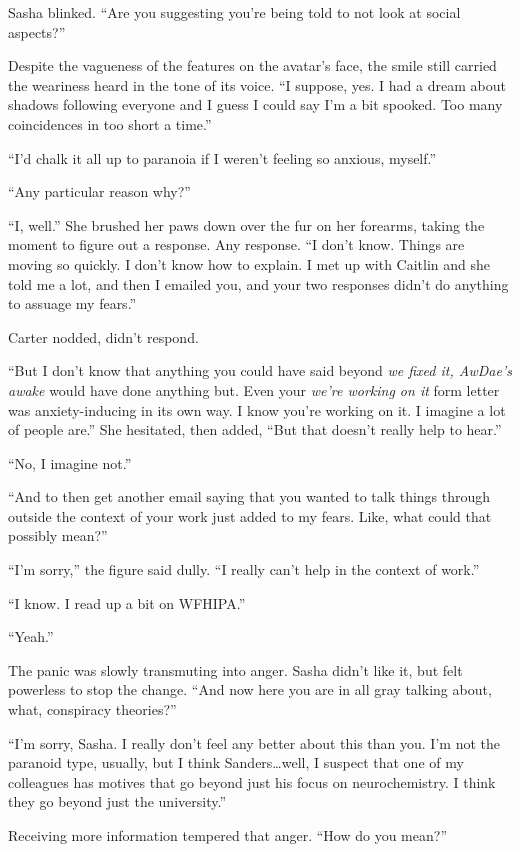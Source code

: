 Sasha blinked. ``Are you suggesting you're being told to not look at social aspects?''

Despite the vagueness of the features on the avatar's face, the smile still carried the weariness heard in the tone of its voice. ``I suppose, yes. I had a dream about shadows following everyone and I guess I could say I'm a bit spooked. Too many coincidences in too short a time.''

``I'd chalk it all up to paranoia if I weren't feeling so anxious, myself.''

``Any particular reason why?''

``I, well.'' She brushed her paws down over the fur on her forearms, taking the moment to figure out a response. Any response. ``I don't know. Things are moving so quickly. I don't know how to explain. I met up with Caitlin and she told me a lot, and then I emailed you, and your two responses didn't do anything to assuage my fears.''

Carter nodded, didn't respond.

``But I don't know that anything you could have said beyond \emph{we fixed it, AwDae's awake} would have done anything but. Even your \emph{we're working on it} form letter was anxiety-inducing in its own way. I know you're working on it. I imagine a lot of people are.'' She hesitated, then added, ``But that doesn't really help to hear.''

``No, I imagine not.''

``And to then get another email saying that you wanted to talk things through outside the context of your work just added to my fears. Like, what could that possibly mean?''

``I'm sorry,'' the figure said dully. ``I really can't help in the context of work.''

``I know. I read up a bit on WFHIPA.''

``Yeah.''

The panic was slowly transmuting into anger. Sasha didn't like it, but felt powerless to stop the change. ``And now here you are in all gray talking about, what, conspiracy theories?''

``I'm sorry, Sasha. I really don't feel any better about this than you. I'm not the paranoid type, usually, but I think Sanders\ldots{}well, I suspect that one of my colleagues has motives that go beyond just his focus on neurochemistry. I think they go beyond just the university.''

Receiving more information tempered that anger. ``How do you mean?''

